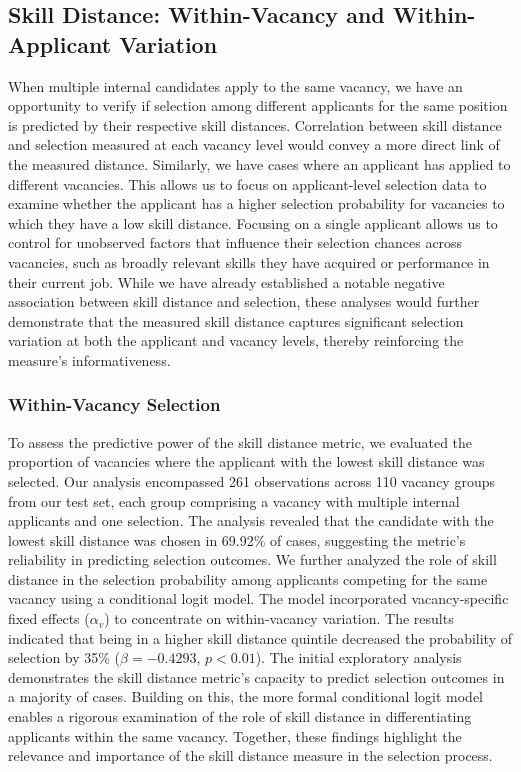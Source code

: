 \subsection{Skill Distance: Within-Vacancy and Within-Applicant Variation}

When multiple internal candidates apply to the same vacancy, we have an opportunity to verify if selection among different applicants for the same position is predicted 
by their respective skill distances. Correlation between skill distance and selection measured at each vacancy level would convey a more direct link of the measured distance. 
Similarly, we have cases where an applicant has applied to different vacancies. This allows us to focus on applicant-level selection data to examine whether the applicant 
has a higher selection probability for vacancies to which they have a low skill distance. Focusing on a single applicant allows us to control for unobserved factors that 
influence their selection chances across vacancies, such as broadly relevant skills they have acquired or performance in their current job. While we have already established 
a notable negative association between skill distance and selection, these analyses would further demonstrate that the measured skill distance captures significant selection 
variation at both the applicant and vacancy levels, thereby reinforcing the measure's informativeness.



\subsubsection{Within-Vacancy Selection}

To assess the predictive power of the skill distance metric, we evaluated the proportion of vacancies where the applicant with the lowest skill distance was selected. Our 
analysis encompassed 261 observations across 110 vacancy groups from our test set, each group comprising a vacancy with multiple internal applicants and one selection. The 
analysis revealed that the candidate with the lowest skill distance was chosen in 69.92\% of cases, suggesting the metric's reliability in predicting selection outcomes. We 
further analyzed the role of skill distance in the selection probability among applicants competing for the same vacancy using a conditional logit model. The model incorporated 
vacancy-specific fixed effects ($\alpha_v$) to concentrate on within-vacancy variation. The results indicated that being in a higher skill distance quintile decreased the 
probability of selection by 35\% ($\beta = -0.4293$, $p < 0.01$). The initial exploratory analysis demonstrates the skill distance metric's capacity to predict selection 
outcomes in a majority of cases. Building on this, the more formal conditional logit model enables a rigorous examination of the role of skill distance in differentiating 
applicants within the same vacancy. Together, these findings highlight the relevance and importance of the skill distance measure in the selection process. 

